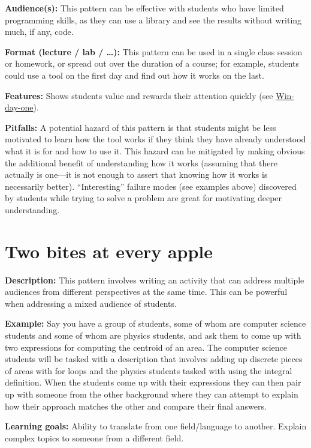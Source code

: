 \documentclass[]{book}
\begin{document}
\textbf{Audience(s):} This pattern can be effective with students who
have limited programming skills, as they can use a library and see the
results without writing much, if any, code.

\textbf{Format (lecture / lab / \ldots{}):} This pattern can be used in
a single class session or homework, or spread out over the duration of a
course; for example, students could use a tool on the first day and find
out how it works on the last.

\textbf{Features:} Shows students value and rewards their attention
quickly (see \protect\hyperlink{win-day-one}{Win-day-one}).

\textbf{Pitfalls:} A potential hazard of this pattern is that students
might be less motivated to learn how the tool works if they think they
have already understood what it is for and how to use it. This hazard
can be mitigated by making obvious the additional benefit of
understanding how it works (assuming that there actually is one---it is
not enough to assert that knowing how it works is necessarily better).
``Interesting'' failure modes (see examples above) discovered by
students while trying to solve a problem are great for motivating deeper
understanding.

\section{Two bites at every apple}\label{two-bites-at-every-apple}

\textbf{Description:} This pattern involves writing an activity that can
address multiple audiences from different perspectives at the same time.
This can be powerful when addressing a mixed audience of students.

\textbf{Example:} Say you have a group of students, some of whom are
computer science students and some of whom are physics students, and ask
them to come up with two expressions for computing the centroid of an
area. The computer science students will be tasked with a description
that involves adding up discrete pieces of areas with for loops and the
physics students tasked with using the integral definition. When the
students come up with their expressions they can then pair up with
someone from the other background where they can attempt to explain how
their approach matches the other and compare their final answers.

\textbf{Learning goals:} Ability to translate from one field/language to
another. Explain complex topics to someone from a different field.
\end{document}
